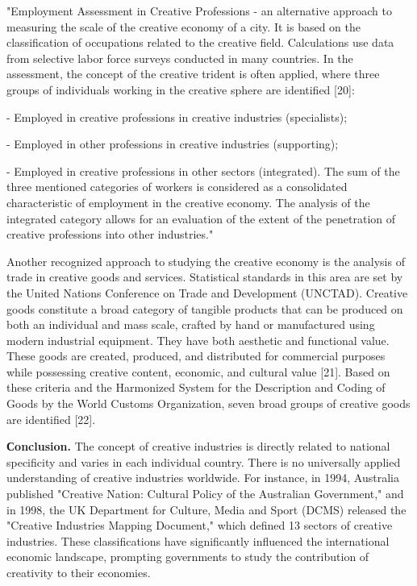 \begin{multicols}{2}
"Employment Assessment in Creative Professions - an alternative approach
to measuring the scale of the creative economy of a city. It is based on
the classification of occupations related to the creative field.
Calculations use data from selective labor force surveys conducted in
many countries. In the assessment, the concept of the
\textquotesingle creative trident\textquotesingle{} is often applied,
where three groups of individuals working in the creative sphere are
identified {[}20{]}:

- Employed in creative professions in creative industries
(\textquotesingle specialists\textquotesingle);

- Employed in other professions in creative industries
(\textquotesingle supporting\textquotesingle);

- Employed in creative professions in other sectors
(\textquotesingle integrated\textquotesingle). The sum of the three
mentioned categories of workers is considered as a consolidated
characteristic of employment in the creative economy. The analysis of
the \textquotesingle integrated\textquotesingle{} category allows for an
evaluation of the extent of the penetration of creative professions into
other industries."

Another recognized approach to studying the creative economy is the
analysis of trade in creative goods and services. Statistical standards
in this area are set by the United Nations Conference on Trade and
Development (UNCTAD). Creative goods constitute a broad category of
tangible products that can be produced on both an individual and mass
scale, crafted by hand or manufactured using modern industrial
equipment. They have both aesthetic and functional value. These goods
are created, produced, and distributed for commercial purposes while
possessing creative content, economic, and cultural value {[}21{]}.
Based on these criteria and the Harmonized System for the Description
and Coding of Goods by the World Customs Organization, seven broad
groups of creative goods are identified {[}22{]}.

{\bfseries Сonclusion.} The concept of creative industries is directly
related to national specificity and varies in each individual country.
There is no universally applied understanding of creative industries
worldwide. For instance, in 1994, Australia published "Creative Nation:
Cultural Policy of the Australian Government," and in 1998, the UK
Department for Culture, Media and Sport (DCMS) released the "Creative
Industries Mapping Document," which defined 13 sectors of creative
industries. These classifications have significantly influenced the
international economic landscape, prompting governments to study the
contribution of creativity to their economies.


\end{multicols}
